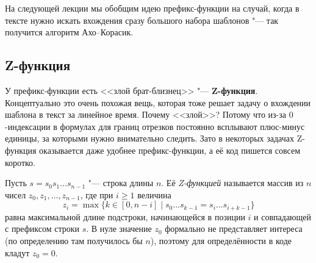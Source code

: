 \begin{note}
    На следующей лекции мы обобщим идею префикс-функции на случай, когда в тексте нужно искать вхождения сразу большого набора шаблонов "--- так получится алгоритм Ахо--Корасик.
\end{note}

\subsection{Z-функция}

У префикс-функции есть <<злой брат-близнец>> "--- \textbf{Z-функция}. Концептуально это очень похожая вещь, которая тоже решает задачу о вхождении шаблона в текст за линейное время. Почему <<злой>>? Потому что из-за $0$-индексации в формулах для границ отрезков постоянно всплывают плюс-минус единицы, за которыми нужно внимательно следить. Зато в некоторых задачах Z-функция оказывается даже удобнее префикс-функции, а её код пишется совсем коротко.

\begin{definition}
    Пусть $s = s_0 s_1 \dots s_{n-1}$ "--- строка длины $n$. Её \textit{Z-функцией} называется массив из $n$ чисел $z_0, z_1, \dots, z_{n-1}$, где при $i \ge 1$ величина
    \[
        z_i = \max \bigl\{k \in [0, n - i] \;\big|\; s_0 \dots s_{k-1} = s_i \dots s_{i+k-1}\bigr\}
    \]
    равна максимальной длине подстроки, начинающейся в позиции $i$ и совпадающей с префиксом строки $s$. В нуле значение $z_0$ формально не представляет интереса (по определению там получилось бы $n$), поэтому для определённости в коде кладут $z_0 = 0$.
\end{definition}

\begin{center}
\end{center}

